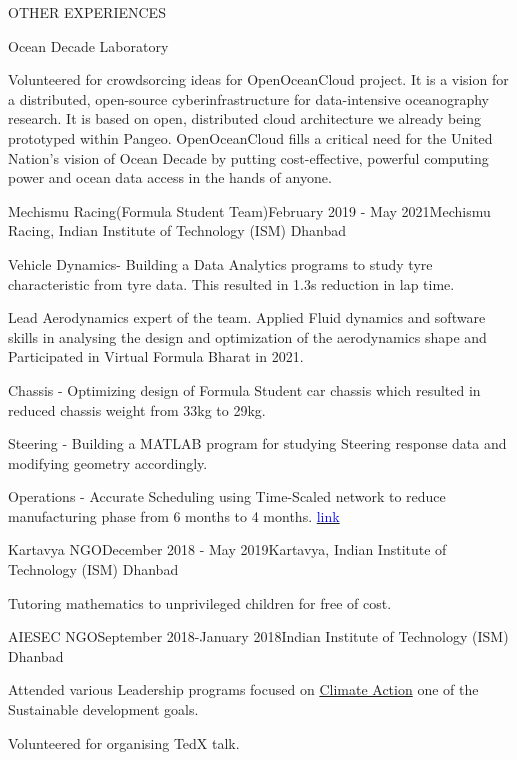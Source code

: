 \documentclass{resume} %
\begin{document}
\begin{rSection}{OTHER EXPERIENCES}
\begin{rSubsection}{Ocean Decade Laboratory}{}{}
\item Volunteered for crowdsorcing ideas for OpenOceanCloud project. It is a vision for a distributed, open-source cyberinfrastructure for data-intensive oceanography research. It is based on open, distributed cloud architecture we already being prototyped within Pangeo. OpenOceanCloud fills a critical need for the United Nation's vision of Ocean Decade by putting cost-effective, powerful computing power and ocean data access in the hands of anyone.
\end{rSubsection}

\begin{rSubsection}{Mechismu Racing(Formula Student Team)}{February 2019 - May 2021}{Mechismu Racing, Indian Institute of Technology (ISM) Dhanbad}
\item Vehicle Dynamics- Building a Data Analytics programs to study tyre characteristic from tyre data. This resulted in 1.3s reduction in lap time.
\item Lead Aerodynamics expert of the team. Applied Fluid dynamics and software skills in analysing the design and optimization of the aerodynamics shape and Participated in Virtual Formula Bharat in 2021. 
\item Chassis - Optimizing design of Formula Student car chassis which resulted in reduced chassis weight from 33kg to 29kg.
\item Steering - Building a MATLAB program for studying Steering response data and modifying geometry accordingly.
\item Operations - Accurate Scheduling using Time-Scaled network to reduce manufacturing phase from 6 months to 4 months.
\href{https://drive.google.com/file/d/1gxg4ES_sFsu9u8YnKFnXOZkrpout1oJu/view?usp=sharing}{\textcolor{blue}{link}}

\end{rSubsection}

\begin{rSubsection}{Kartavya NGO}{December 2018 - May 2019}{Kartavya, Indian Institute of Technology (ISM) Dhanbad}
\item Tutoring mathematics to unprivileged children for free of cost. 
\end{rSubsection}

\begin{rSubsection}{AIESEC NGO}{September 2018-January 2018}{Indian Institute of Technology (ISM) Dhanbad}
\item Attended various Leadership programs focused on \underline{Climate Action} one of the Sustainable development goals.
\item Volunteered for organising TedX talk. 
\end{rSubsection}

\end{rSection}
\end{document}
